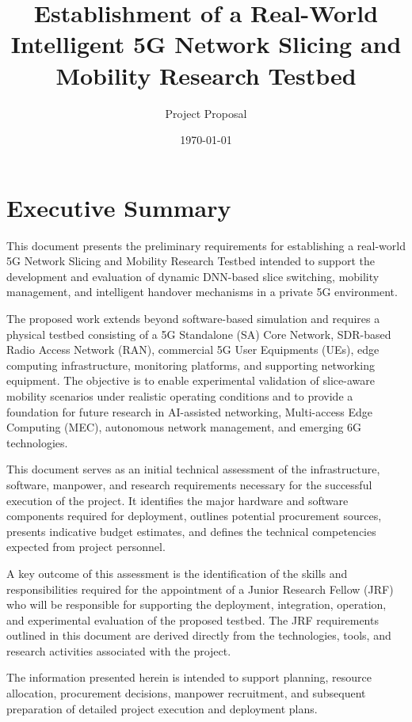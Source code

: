 \documentclass[12pt,a4paper]{article}
\title{Establishment of a Real-World Intelligent 5G Network Slicing and Mobility Research Testbed}
\author{Project Proposal}
\date{\today}
\begin{document}
\maketitle
\tableofcontents
\newpage

\section{Executive Summary}

This document presents the preliminary requirements for establishing a real-world 5G Network Slicing and Mobility Research Testbed intended to support the development and evaluation of dynamic DNN-based slice switching, mobility management, and intelligent handover mechanisms in a private 5G environment.

The proposed work extends beyond software-based simulation and requires a physical testbed consisting of a 5G Standalone (SA) Core Network, SDR-based Radio Access Network (RAN), commercial 5G User Equipments (UEs), edge computing infrastructure, monitoring platforms, and supporting networking equipment. The objective is to enable experimental validation of slice-aware mobility scenarios under realistic operating conditions and to provide a foundation for future research in AI-assisted networking, Multi-access Edge Computing (MEC), autonomous network management, and emerging 6G technologies.

This document serves as an initial technical assessment of the infrastructure, software, manpower, and research requirements necessary for the successful execution of the project. It identifies the major hardware and software components required for deployment, outlines potential procurement sources, presents indicative budget estimates, and defines the technical competencies expected from project personnel.

A key outcome of this assessment is the identification of the skills and responsibilities required for the appointment of a Junior Research Fellow (JRF) who will be responsible for supporting the deployment, integration, operation, and experimental evaluation of the proposed testbed. The JRF requirements outlined in this document are derived directly from the technologies, tools, and research activities associated with the project.

The information presented herein is intended to support planning, resource allocation, procurement decisions, manpower recruitment, and subsequent preparation of detailed project execution and deployment plans.
\end{document}
